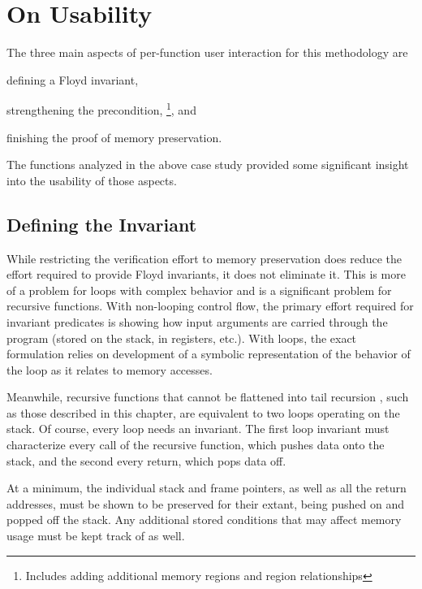 \section{On Usability}\label{se:usability}
The three main aspects of per-function user interaction for this methodology are
\begin{enumerate*}
  \item defining a Floyd invariant,
  \item strengthening the precondition,%
    \footnote{Includes adding additional memory regions and region relationships}, and
  \item finishing the proof of memory preservation.
\end{enumerate*}
The functions analyzed in the above case study provided some significant insight
into the usability of those aspects.

\subsection{Defining the Invariant}
While restricting the verification effort to memory preservation
does reduce the effort required to provide Floyd invariants, it does not eliminate it.
This is more of a problem for loops with complex behavior
and is a significant problem for recursive functions.
With non-looping control flow,
the primary effort required for invariant predicates is showing how input arguments
are carried through the program (stored on the stack, in registers, etc.).%
%
With loops, the exact formulation relies on development of a symbolic representation
of the behavior of the loop as it relates to memory accesses.

Meanwhile, recursive functions that cannot be flattened into tail recursion \autocite{probst2001proper},
such as those described in this chapter,
are equivalent to two loops operating on the stack.
Of course, every loop needs an invariant.
The first loop invariant must characterize every call of the recursive function,
which pushes data onto the stack, and the second every return, which pops data off.

At a minimum, the individual stack and frame pointers,
as well as all the return addresses, must be shown to
be preserved for their extant,%
%
%
being pushed on and popped off the stack.
Any additional stored conditions
that may affect memory usage must be kept track of as well.

